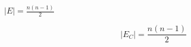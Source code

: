 \documentclass{article}
\begin{document}
$ |E| = \frac{n(n-1)}{2} $
\pagebreak

\[  |E_C| = \frac{n(n-1)}{2}
\]
\pagebreak
\end{document}
